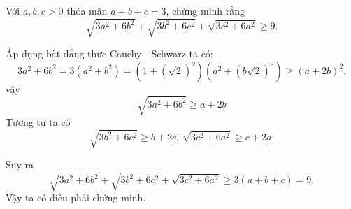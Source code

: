 \begin{problem}
	Với $a, b, c > 0$ thỏa mãn $a + b + c = 3$, chứng minh rằng
	$$
		\sqrt{3a^2 + 6b^2} + \sqrt{3b^2 + 6c^2} + \sqrt{3c^2 + 6a^2} \ge 9.
	$$
	\solution

	Áp dụng bất đẳng thưc Cauchy - Schwarz ta có:
	$$
		3a^2 + 6b^2 = 3(a^2 + b^2) = (1 + (\sqrt{2})^2)(a^2 + (b\sqrt{2})^2) \ge (a + 2b)^2.
	$$
	vậy
	$$
		\sqrt{3a^2 + 6b^2} \ge a + 2b
	$$
	Tương tự ta có $$\sqrt{3b^2 + 6c^2} \ge b + 2c,\ \sqrt{3c^2 + 6a^2} \ge c + 2a.$$

	Suy ra 
	$$
		\sqrt{3a^2 + 6b^2} + \sqrt{3b^2 + 6c^2} + \sqrt{3c^2 + 6a^2} \ge 3(a + b + c) = 9.
	$$
	Vậy ta có điều phải chứng minh.
\end{problem}
